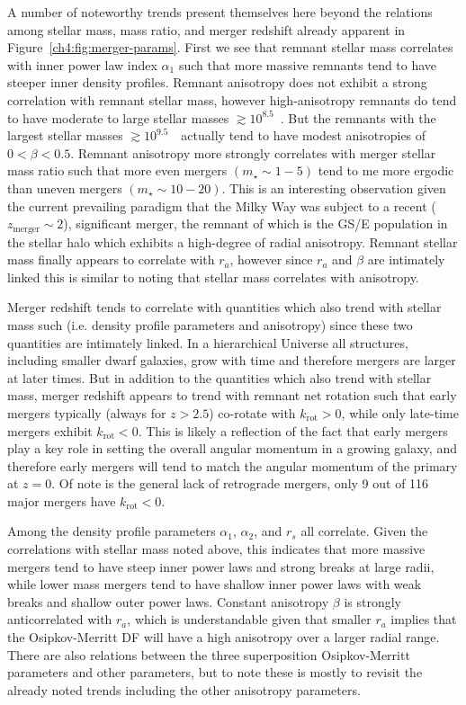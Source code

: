 A number of noteworthy trends present themselves here beyond the relations among stellar mass, mass ratio, and merger redshift already apparent in Figure~\ref{ch4:fig:merger-params}. First we see that remnant stellar mass correlates with inner power law index $\alpha_{1}$ such that more massive remnants tend to have steeper inner density profiles. Remnant anisotropy does not exhibit a strong correlation with remnant stellar mass, however high-anisotropy remnants do tend to have moderate to large stellar masses $\gtrsim 10^{8.5}$~\Msun. But the remnants with the largest stellar masses $\gtrsim 10^{9.5}$~\Msun\ actually tend to have modest anisotropies of $0 < \beta < 0.5$. Remnant anisotropy more strongly correlates with merger stellar mass ratio such that more even mergers $(m_{\star} \sim 1-5)$ tend to me more ergodic than uneven mergers $(m_{\star} \sim 10-20)$. This is an interesting observation given the current prevailing paradigm that the Milky Way was subject to a recent ($z_\mathrm{merger} \sim 2$), significant merger, the remnant of which is the GS/E population in the stellar halo which exhibits a high-degree of radial anisotropy. Remnant stellar mass finally appears to correlate with $r_{a}$, however since $r_{a}$ and $\beta$ are intimately linked this is similar to noting that stellar mass correlates with anisotropy.

Merger redshift tends to correlate with quantities which also trend with stellar mass such (i.e. density profile parameters and anisotropy) since these two quantities are intimately linked. In a hierarchical Universe all structures, including smaller dwarf galaxies, grow with time and therefore mergers are larger at later times. But in addition to the quantities which also trend with stellar mass, merger redshift appears to trend with remnant net rotation such that early mergers typically (always for $z>2.5$) co-rotate with $k_\mathrm{rot} > 0$, while only late-time mergers exhibit $k_\mathrm{rot} < 0$. This is likely a reflection of the fact that early mergers play a key role in setting the overall angular momentum in a growing galaxy, and therefore early mergers will tend to match the angular momentum of the primary at $z=0$. Of note is the general lack of retrograde mergers, only 9 out of 116 major mergers have $k_\mathrm{rot} < 0$.

Among the density profile parameters $\alpha_{1}$, $\alpha_{2}$, and $r_{s}$ all correlate. Given the correlations with stellar mass noted above, this indicates that more massive mergers tend to have steep inner power laws and strong breaks at large radii, while lower mass mergers tend to have shallow inner power laws with weak breaks and shallow outer power laws. Constant anisotropy $\beta$ is strongly anticorrelated with $r_{a}$, which is understandable given that smaller $r_{a}$ implies that the Osipkov-Merritt DF will have a high anisotropy over a larger radial range. There are also relations between the three superposition Osipkov-Merritt parameters and other parameters, but to note these is mostly to revisit the already noted trends including the other anisotropy parameters.


